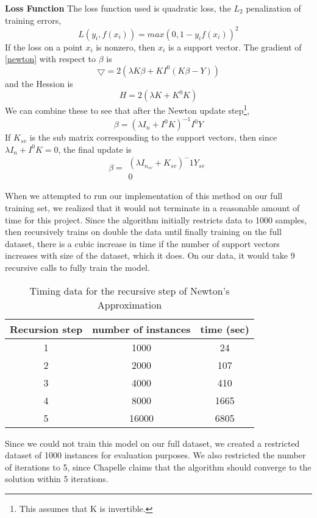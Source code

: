 \documentclass[letterpaper, 11pt]{article}
\begin{document}
 \textbf{Loss Function}  The loss function used is quadratic loss, the $L_2$ penalization of training errors, $$ L(y_i, f(x_i)) = max (0, 1-y_if(x_i))^2 $$  If the loss on a point $x_i$ is nonzero, then $x_i$ is a support vector.  The gradient of \eqref{newton} with respect to $\beta$ is $$ \bigtriangledown = 2(\lambda K \beta + K I^0(K\beta -Y) ) $$ and the Hession is $$ H = 2(\lambda K + K^0 K) $$  We can combine these to see that after the Newton update step\footnote{This assumes that K is invertible.}, \begin{equation} \beta = (\lambda I_n + I^0K)^{-1}I^0Y  \end{equation}  If $K_{sv}$ is the sub matrix corresponding to the support vectors, then since $\lambda I_n + I^0 K = 0$, the final update is \begin{equation}  \beta = \begin{matrix} (\lambda I_{n_{sv}} + K_{sv})^-1 Y_{sv} \\ 0 \end{matrix}\end{equation}

When we attempted to run our implementation of this method on our full training set, we realized that it would not terminate in a reasonable amount of time for this project.  Since the algorithm initially restricts data to 1000 samples, then recursively trains on double the data until finally training on the full dataset, there is a cubic increase in time if the number of support vectors increases with size of the dataset, which it does.  On our data, it would take 9 recursive calls to fully train the model.

\begin{table}
\centering
\begin{tabular}{c|cc}
\textbf{Recursion step} & \textbf{number of instances} & \textbf{time} (sec)\\
\hline
1 & 1000 & 24\\
2 & 2000 & 107\\
3 & 4000 & 410\\
4 & 8000 & 1665\\
5 & 16000 & 6805\\
\end{tabular}
\caption{Timing data for the recursive step of Newton's Approximation}
\end{table}

Since we could not train this model on our full dataset, we created a restricted dataset of 1000 instances for evaluation purposes.  We also restricted the number of iterations to 5, since Chapelle claims that the algorithm should converge to the solution within 5 iterations.
\end{document}
